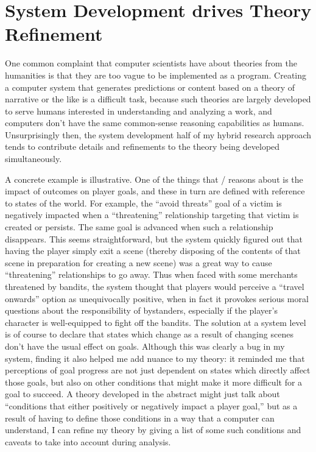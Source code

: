 \section{System Development drives Theory Refinement}


One common complaint that computer scientists have about theories from the humanities is that they are too vague to be implemented as a program.
%
Creating a computer system that generates predictions or content based on a theory of narrative or the like is a difficult task, because such theories are largely developed to serve humans interested in understanding and analyzing a work, and computers don't have the same common-sense reasoning capabilities as humans.
%
Unsurprisingly then, the system development half of my hybrid research approach tends to contribute details and refinements to the theory being developed simultaneously.


A concrete example is illustrative.
%
One of the things that \dunyazad/ reasons about is the impact of outcomes on player goals, and these in turn are defined with reference to states of the world.
%
For example, the ``avoid threats'' goal of a victim is negatively impacted when a ``threatening'' relationship targeting that victim is created or persists.
%
The same goal is advanced when such a relationship disappears.
%
This seems straightforward, but the system quickly figured out that having the player simply exit a scene (thereby disposing of the contents of that scene in preparation for creating a new scene) was a great way to cause ``threatening'' relationships to go away.
%
Thus when faced with some merchants threatened by bandits, the system thought that players would perceive a ``travel onwards'' option as unequivocally positive, when in fact it provokes serious moral questions about the responsibility of bystanders, especially if the player's character is well-equipped to fight off the bandits.
%
The solution at a system level is of course to declare that states which change as a result of changing scenes don't have the usual effect on goals.
%
Although this was clearly a bug in my system, finding it also helped me add nuance to my theory: it reminded me that perceptions of goal progress are not just dependent on states which directly affect those goals, but also on other conditions that might make it more difficult for a goal to succeed.
%
A theory developed in the abstract might just talk about ``conditions that either positively or negatively impact a player goal,'' but as a result of having to define those conditions in a way that a computer can understand, I can refine my theory by giving a list of some such conditions and caveats to take into account during analysis.


